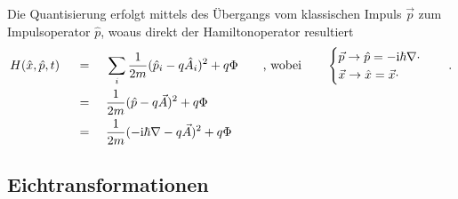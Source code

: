 \documentclass[a4paper,11pt, twoside]{article}
\newcommand{\+}{\dagger}
\renewcommand{\v}{\vec}
\renewcommand{\^}{\hat}
\renewcommand{\tt}{\text}
\renewcommand{\~}{\widetilde}
\begin{document}
Die Quantisierung erfolgt mittels des Übergangs vom klassischen Impuls $\v p$ zum Impulsoperator $\^p$, woaus direkt der Hamiltonoperator resultiert
\begin{alignat*}{5}
& H(\^ x,\^ p,t)&& \ =\  && \sum_i \frac{1}{2m}(\^ p_i-q \^A_i)^2+q\Phi  &&\quad \tt{, wobei}\quad &&
\begin{cases}
   \v p \rightarrow \^p=-\tt i \hbar \nabla\cdot \\
     \v x \rightarrow \^x=\v x \cdot  
\end{cases} \quad. \\
& && \ = \ && \frac{1}{2m}(\^ p -q \v A)^2+q\Phi &&  &&  \\
& && \ = \ && \frac{1}{2m}(-\tt i \hbar \nabla -q \v A)^2+q\Phi 
\end{alignat*}
\subsection{Eichtransformationen}
\end{document}
